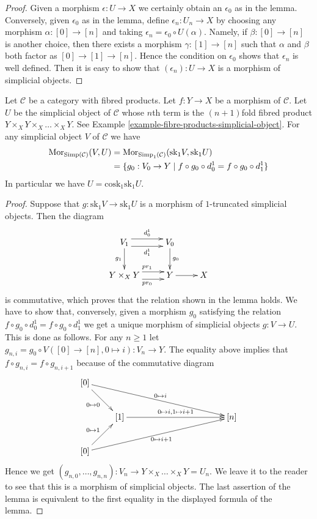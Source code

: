\begin{proof}
Given a morphism $\epsilon : U \to X$
we certainly obtain an $\epsilon_0$ as in the lemma.
Conversely, given $\epsilon_0$ as in the lemma, define
$\epsilon_n : U_n \to X$ by choosing any
morphism $\alpha : [0] \to [n]$ and taking
$\epsilon_n = \epsilon_0 \circ U(\alpha)$.
Namely, if $\beta : [0] \to [n]$ is another
choice, then there exists a morphism
$\gamma : [1] \to [n]$ such that $\alpha$
and $\beta$ both factor as $[0] \to [1] \to [n]$.
Hence the condition on $\epsilon_0$ shows that
$\epsilon_n$ is well defined. Then it is
easy to show that $(\epsilon_n) : U \to X$
is a morphism of simplicial objects.
\end{proof}

\begin{lemma}
\label{lemma-cosk-minus-one}
Let $\mathcal{C}$ be a category with fibred products.
Let $f : Y\to X$ be a morphism of $\mathcal{C}$. Let $U$ be the
simplicial object of $\mathcal{C}$ whose $n$th term
is the $(n + 1)$fold fibred product
$Y \times_X Y \times_X \ldots \times_X Y$.
See Example \ref{example-fibre-products-simplicial-object}.
For any simplicial object $V$ of $\mathcal{C}$ we have
\begin{align*}
\mathop{\mathrm{Mor}}\nolimits_{\text{Simp}(\mathcal{C})}(V, U)
& =
\mathop{\mathrm{Mor}}\nolimits_{\text{Simp}_1(\mathcal{C})}(\text{sk}_1 V, \text{sk}_1 U) \\
& =
\{g_0 : V_0 \to Y \mid f \circ g_0 \circ d^1_0 = f \circ g_0 \circ d^1_1\}
\end{align*}
In particular we have $U = \text{cosk}_1 \text{sk}_1 U$.
\end{lemma}

\begin{proof}
Suppose that $g : \text{sk}_1V \to \text{sk}_1U$ is a morphism of
$1$-truncated simplicial objects. Then the diagram
$$
\xymatrix{
V_1 \ar@<1ex>[r]^{d^1_0} \ar@<-1ex>[r]_{d^1_1} \ar[d]_{g_1} &
V_0 \ar[d]^{g_0} \\
Y \times_X Y \ar@<1ex>[r]^{pr_1} \ar@<-1ex>[r]_{pr_0} &
Y \ar[r] & X
}
$$
is commutative, which proves that the relation shown in
the lemma holds. We have to show that,
conversely, given a morphism $g_0$ satisfying the relation
$f \circ g_0 \circ d^1_0 = f \circ g_0 \circ d^1_1$
we get a unique morphism of simplicial objects $g : V \to U$.
This is done as follows. For any $n \geq 1$ let
$g_{n, i} = g_0 \circ V([0] \to [n], 0 \mapsto i) :
V_n \to Y$. The equality above implies that
$f \circ g_{n, i} = f \circ g_{n, i + 1}$ because of
the commutative diagram
$$
\xymatrix{
[0] \ar[rd]_{0 \mapsto 0} \ar[rrrrrd]^{0 \mapsto i} \\
& [1] \ar[rrrr]^{0 \mapsto i, 1\mapsto i + 1} & & & & [n] \\
[0] \ar[ru]^{0 \mapsto 1} \ar[rrrrru]_{0 \mapsto i + 1}
}
$$
Hence we get
$(g_{n, 0}, \ldots, g_{n, n}) : V_n \to Y \times_X\ldots \times_X Y = U_n$.
We leave it to the reader to see that this is a morphism of simplicial
objects. The last assertion of the lemma is equivalent to the
first equality in the displayed formula of the lemma.
\end{proof}

